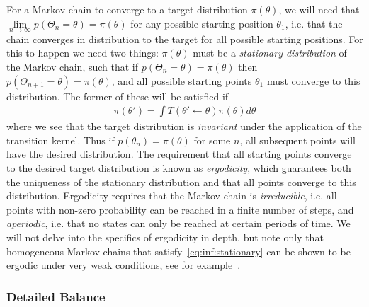  For a Markov chain to converge to a target distribution $\pi (\theta)$, we will need that
$\lim\limits_{n\rightarrow\infty} p(\Theta_n=\theta) = \pi(\theta)$ for any possible starting position $\theta_1$, i.e.
that the chain converges in distribution to the target for all possible starting positions.   For this
to happen we need two things: $\pi(\theta)$ must be a \emph{stationary distribution} of the Markov
chain, such that if $p(\Theta_n=\theta) = \pi(\theta)$ then $p(\Theta_{n+1}=\theta) = \pi(\theta)$, and all possible starting points
$\theta_1$ must converge to this distribution.  
The former of these will be satisfied if 
\begin{align}
\label{eq:inf:stationary}
\pi(\theta') = \int T(\theta' \leftarrow \theta) \pi(\theta)d\theta
\end{align}
where we see that the target distribution is \emph{invariant} under the application of the transition kernel.
Thus if $p(\theta_n)=\pi(\theta)$ for some $n$, all subsequent points will have the desired distribution.
The requirement that all starting points converge to the desired target distribution is known
as \emph{ergodicity}, which guarantees both the uniqueness of the stationary distribution
and that all points converge to this distribution.  Ergodicity requires that the Markov chain is
\emph{irreducible}, i.e. all points with non-zero probability can be reached in a finite number
of steps, and \emph{aperiodic}, i.e. that no states can only be reached at certain periods of 
time.   We will not delve into the specifics of ergodicity in depth, but note only that homogeneous
Markov chains that satisfy~\eqref{eq:inf:stationary} can be shown to be ergodic under very weak
conditions, see for example~\cite{neal1993probabilistic,tierney1994markov}.

\subsubsection{Detailed Balance}
\label{sec:inf:foundation:mcmc:db}

